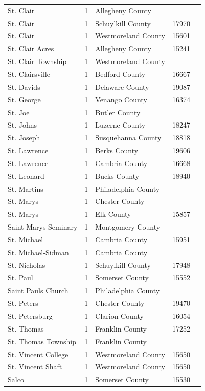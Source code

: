 \documentclass{article}
\begin{document}
\begin{tabular}{lllll}
St. Clair & 1 & Allegheny County &  &  \\
St. Clair & 1 & Schuylkill County & 17970 &  \\
St. Clair & 1 & Westmoreland County & 15601 &  \\
St. Clair Acres & 1 & Allegheny County & 15241 &  \\
St. Clair Township & 1 & Westmoreland County &  &  \\
St. Clairsville & 1 & Bedford County & 16667 &  \\
St. Davids & 1 & Delaware County & 19087 &  \\
St. George & 1 & Venango County & 16374 &  \\
St. Joe & 1 & Butler County &  &  \\
St. Johns & 1 & Luzerne County & 18247 &  \\
St. Joseph & 1 & Susquehanna County & 18818 &  \\
St. Lawrence & 1 & Berks County & 19606 &  \\
St. Lawrence & 1 & Cambria County & 16668 &  \\
St. Leonard & 1 & Bucks County & 18940 &  \\
St. Martins & 1 & Philadelphia County &  &  \\
St. Marys & 1 & Chester County &  &  \\
St. Marys & 1 & Elk County & 15857 &  \\
Saint Marys Seminary & 1 & Montgomery County &  &  \\
St. Michael & 1 & Cambria County & 15951 &  \\
St. Michael-Sidman & 1 & Cambria County &  &  \\
St. Nicholas & 1 & Schuylkill County & 17948 &  \\
St. Paul & 1 & Somerset County & 15552 &  \\
Saint Pauls Church & 1 & Philadelphia County &  &  \\
St. Peters & 1 & Chester County & 19470 &  \\
St. Petersburg & 1 & Clarion County & 16054 &  \\
St. Thomas & 1 & Franklin County & 17252 &  \\
St. Thomas Township & 1 & Franklin County &  &  \\
St. Vincent College & 1 & Westmoreland County & 15650 &  \\
St. Vincent Shaft & 1 & Westmoreland County & 15650 &  \\
Salco & 1 & Somerset County & 15530 &  \\

\end{tabular}
\end{document}
